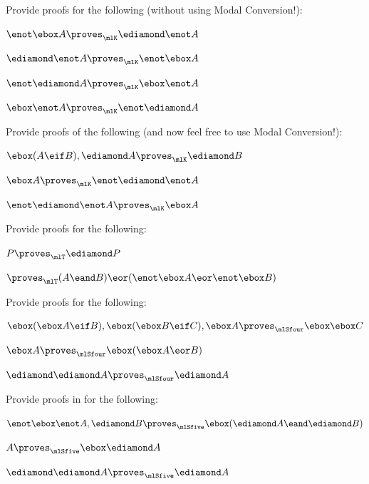 \problempart
Provide proofs for the following (without using Modal Conversion!):
\begin{compactlist}
	\item $\enot\ebox A\proves_\mlK \ediamond \enot A$
	\item $\ediamond\enot A\proves_\mlK\enot \ebox A$
	\item $\enot\ediamond A\proves_\mlK\ebox\enot A$
	\item $\ebox\enot A\proves_\mlK\enot\ediamond A$
\end{compactlist}

\problempart
Provide proofs of the following (and now feel free to use Modal Conversion!):
\begin{compactlist}
	\item $\ebox(A\eif B), \ediamond A \proves_\mlK \ediamond B$
	\item $\ebox A \proves_\mlK \enot\ediamond\enot A$
	\item $\enot\ediamond\enot A \proves_\mlK \ebox A$
\end{compactlist}

\problempart
Provide proofs for the following:
\begin{compactlist}
	\item $P\proves_\mlT\ediamond P$
	\item $\proves_\mlT (A\eand B)\eor(\enot \ebox A\eor\enot\ebox B)$
\end{compactlist}

\problempart
Provide proofs for the following:
\begin{compactlist}
	\item $\ebox(\ebox A\eif B), \ebox (\ebox B\eif C), \ebox A \proves_\mlSfour \ebox\ebox C$
	\item $\ebox A \proves_\mlSfour \ebox(\ebox A \eor B)$
	\item $\ediamond \ediamond A \proves_\mlSfour \ediamond A$
\end{compactlist}


\problempart
Provide proofs in \mlSfive{} for the following:
\begin{compactlist}
	\item $\enot\ebox\enot A, \ediamond B\proves_\mlSfive \ebox(\ediamond A \eand \ediamond B)$
	\item $A \proves_\mlSfive  \ebox\ediamond A$
	\item $\ediamond\ediamond A\proves_\mlSfive  \ediamond A$
\end{compactlist}


